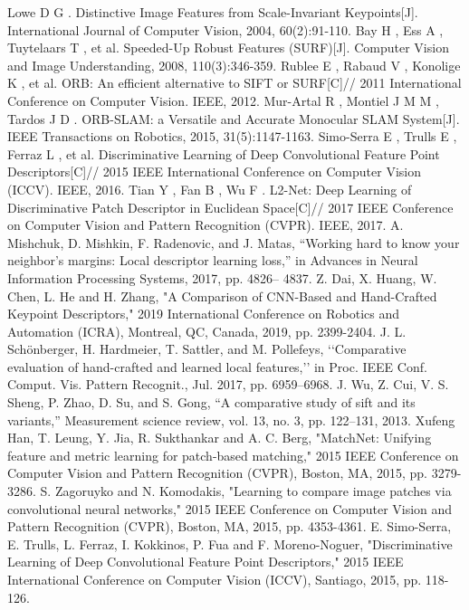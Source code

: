 \documentclass[letterpaper, 10 pt, conference]{ieeeconf}  %
\begin{document}
\begin{thebibliography}{99}

 Lowe D G . Distinctive Image Features from Scale-Invariant Keypoints[J]. International Journal of Computer Vision, 2004, 60(2):91-110.
 Bay H , Ess A , Tuytelaars T , et al. Speeded-Up Robust Features (SURF)[J]. Computer Vision and Image Understanding, 2008, 110(3):346-359.
 Rublee E , Rabaud V , Konolige K , et al. ORB: An efficient alternative to SIFT or SURF[C]// 2011 International Conference on Computer Vision. IEEE, 2012.
 Mur-Artal R , Montiel J M M , Tardos J D . ORB-SLAM: a Versatile and Accurate Monocular SLAM System[J]. IEEE Transactions on Robotics, 2015, 31(5):1147-1163.
 Simo-Serra E , Trulls E , Ferraz L , et al. Discriminative Learning of Deep Convolutional Feature Point Descriptors[C]// 2015 IEEE International Conference on Computer Vision (ICCV). IEEE, 2016.
 Tian Y , Fan B , Wu F . L2-Net: Deep Learning of Discriminative Patch Descriptor in Euclidean Space[C]// 2017 IEEE Conference on Computer Vision and Pattern Recognition (CVPR). IEEE, 2017.
 A. Mishchuk, D. Mishkin, F. Radenovic, and J. Matas, “Working hard to know your neighbor’s margins: Local descriptor learning loss,” in Advances in Neural Information Processing Systems, 2017, pp. 4826– 4837.
 Z. Dai, X. Huang, W. Chen, L. He and H. Zhang, "A Comparison of CNN-Based and Hand-Crafted Keypoint Descriptors," 2019 International Conference on Robotics and Automation (ICRA), Montreal, QC, Canada, 2019, pp. 2399-2404.
 J. L. Schönberger, H. Hardmeier, T. Sattler, and M. Pollefeys, ‘‘Comparative evaluation of hand-crafted and learned local features,’’ in Proc. IEEE Conf. Comput. Vis. Pattern Recognit., Jul. 2017, pp. 6959–6968.
 J. Wu, Z. Cui, V. S. Sheng, P. Zhao, D. Su, and S. Gong, “A comparative study of sift and its variants,” Measurement science review, vol. 13, no. 3, pp. 122–131, 2013.
 Xufeng Han, T. Leung, Y. Jia, R. Sukthankar and A. C. Berg, "MatchNet: Unifying feature and metric learning for patch-based matching," 2015 IEEE Conference on Computer Vision and Pattern Recognition (CVPR), Boston, MA, 2015, pp. 3279-3286.
 S. Zagoruyko and N. Komodakis, "Learning to compare image patches via convolutional neural networks," 2015 IEEE Conference on Computer Vision and Pattern Recognition (CVPR), Boston, MA, 2015, pp. 4353-4361.
 E. Simo-Serra, E. Trulls, L. Ferraz, I. Kokkinos, P. Fua and F. Moreno-Noguer, "Discriminative Learning of Deep Convolutional Feature Point Descriptors," 2015 IEEE International Conference on Computer Vision (ICCV), Santiago, 2015, pp. 118-126.

\end{thebibliography}
\end{document}
